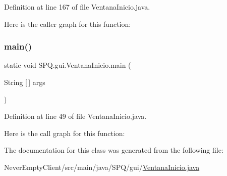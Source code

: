 Definition at line 167 of file Ventana\+Inicio.\+java.

Here is the caller graph for this function\+:
\mbox{\label{class_s_p_q_1_1gui_1_1_ventana_inicio_ab33d2c349f8f7475d2d6833e9bf75e76}} 
\subsubsection{\texorpdfstring{main()}{main()}}
{\footnotesize\ttfamily static void S\+P\+Q.\+gui.\+Ventana\+Inicio.\+main (\begin{DoxyParamCaption}\item[{String \mbox{[}$\,$\mbox{]}}]{args }\end{DoxyParamCaption})\hspace{0.3cm}{\ttfamily [static]}}



Definition at line 49 of file Ventana\+Inicio.\+java.

Here is the call graph for this function\+:


The documentation for this class was generated from the following file\+:\begin{DoxyCompactItemize}
\item 
Never\+Empty\+Client/src/main/java/\+S\+P\+Q/gui/\mbox{\hyperlink{_ventana_inicio_8java}{Ventana\+Inicio.\+java}}\end{DoxyCompactItemize}
